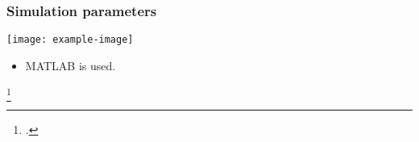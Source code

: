 \documentclass{beamer}
\date{February 10, 2017}
\begin{document}
\begin{frame} 
    \frametitle{Simulation parameters}
    \begin{minipage}{0.5\textwidth}
        \centering
        \texttt{[image: example-image]}
    \end{minipage}%
    \begin{minipage}{0.5\textwidth}
        \begin{itemize}
            \item MATLAB\footnotemark{} is used.
        \end{itemize}
    \end{minipage}%
    \footcitetext{moore}
\end{frame}

\begin{frame}
    \printbibliography
\end{frame}
\end{document}
